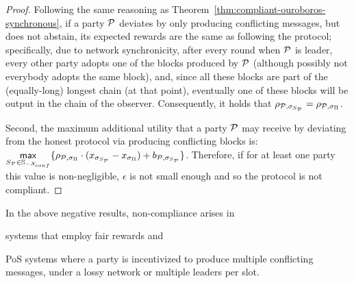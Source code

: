 \begin{proof}
    Following the same reasoning as
    Theorem~\ref{thm:compliant-ouroboros-synchronous}, if a party $\mathcal{P}$
    deviates by only producing conflicting messages, but does not abstain, its
    expected rewards are the same as following the protocol; specifically, due
    to network synchronicity, after every round when $\mathcal{P}$ is leader, every
    other party adopts one of the blocks produced by $\mathcal{P}$ (although
    possibly not everybody adopts the same block), and, since all these blocks
    are part of the (equally-long) longest chain (at that point), eventually
    one of these blocks will be output in the chain of the observer.
    Consequently, it holds that $\rho_{\mathcal{P},
    \sigma_{S_{\mathcal{P}}}} = \rho_{\mathcal{P}, \sigma_{\Pi}}$.

    Second, the maximum additional utility that a party $\mathcal{P}$ may receive by
    deviating from the honest protocol via producing conflicting blocks is:
    $\underset{S_{\mathcal{P}} \in \mathbb{S}_{-\mathcal{X}_{conf}}}{\mathsf{max}}\{ \rho_{\mathcal{P}, \sigma_{\Pi}} \cdot (x_{\sigma_{S_{\mathcal{P}}}} - x_{\sigma_\Pi}) + b_{\mathcal{P}, \sigma_{S_{\mathcal{P}}}} \}$.
    Therefore, if for at least one party this value is non-negligible,
    $\epsilon$ is not small enough and so the protocol is not compliant.
\end{proof}

In the above negative results, non-compliance arises in
\begin{inparaenum}[(a)]
    \item systems that employ fair rewards and
    \item PoS systems where a party is incentivized to produce multiple
        conflicting messages, \ie under a lossy network or multiple leaders per
        slot.
\end{inparaenum}

